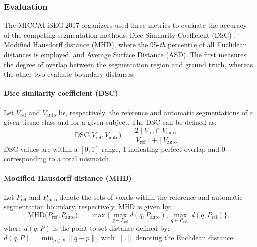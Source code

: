 \documentclass[twoside,espcrc2]{elsarticle}
\newcommand{\mr}[1]{\mathrm{#1}}
\begin{document}


\subsubsection{Evaluation}
\label{sssec:evaluation}

The MICCAI iSEG-2017 organizers used three metrics to evaluate the accuracy of the competing segmentation methods: Dice Similarity Coefficient (DSC) \cite{dice1945measures}, Modified Hausdorff distance (MHD), where the 95-\textit{th} percentile of all Euclidean distances is employed, and Average Surface Distance (ASD). The first measures the degree of overlap between the segmentation region and ground truth, whereas the other two evaluate boundary distances. 

\paragraph{Dice similarity coefficient (DSC)}

Let $V_\mr{ref}$ and $V_\mr{auto}$ be, respectively, the reference and automatic segmentations of a given tissue class and for a given subject. The DSC can be defined as:
\begin{equation}
\mr{DSC}\big(V_\mr{ref}, V_\mr{auto} \big) \ = \ 
    \frac{2 \mid V_\mr{ref} \cap V_\mr{auto}\mid} {\mid V_\mr{ref}\mid +\mid V_\mr{auto}\mid}
\end{equation}
DSC values are within a $[0,1]$ range, 1 indicating perfect overlap and 0 corresponding to a total mismatch.

\paragraph{Modified Hausdorff distance (MHD)}

Let $P_\mr{ref}$ and $P_\mr{auto}$ denote the sets of voxels within the reference and automatic segmentation boundary, respectively. MHD is given by:
\begin{equation}
\mr{MHD}\big(P_\mr{ref}, P_\mr{auto} \big) \ = \ \max \Big\{ \max_{q \in P_\mr{ref}}d(q,P_\mr{auto}), \max_{q \in P_\mr{auto}}d(q,P_\mr{ref}) \Big\},
\end{equation}
where $d(q,P)$ is the point-to-set distance defined by: $d(q,P)=\min_{p \in P} \| q-p\|$, with $\|.\|$ denoting the Euclidean distance. 
\end{document}
